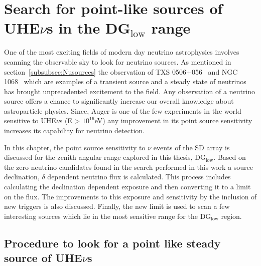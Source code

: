 
\chapter{Search for point-like sources of UHE\texorpdfstring{$\nu$}{}s in the DG\texorpdfstring{$_{\text{low}}$}{} range}
\label{chap:follow-up}

One of the most exciting fields of modern day neutrino astrophysics involves scanning the observable sky to look for neutrino sources. As mentioned in section~\ref{subsubsec:Nusources} the observation of TXS 0506+056~\cite{Icecube_txs} and NGC 1068~\cite{Icecube_2022} which are examples of a transient source and a steady state of neutrinos has brought unprecedented excitement to the field. Any observation of a neutrino source offers a chance to significantly increase our overall knowledge about astroparticle physics. Since, Auger is one of the few experiments in the world sensitive to UHE$\nu$s (E > $10^{16}$eV) any improvement in its point source sensitivity increases its capability for neutrino detection. 

In this chapter, the point source sensitivity to $\nu$ events of the SD array is discussed for the zenith angular range explored in this thesis, DG$_{\text{low}}$. Based on the zero neutrino candidates found in the search performed in this work a source declination, $\delta$ dependent neutrino flux is calculated. This process includes calculating the declination dependent exposure and then converting it to a limit on the flux. The improvements to this exposure and sensitivity by the inclusion of new triggers is also discussed. Finally, the new limit is used to scan a few interesting sources which lie in the most sensitive range for the DG$_{\text{low}}$ region.

\section{Procedure to look for a point like steady source of UHE\texorpdfstring{$\nu$}{}s}
\label{sec:procedure_point_source}


